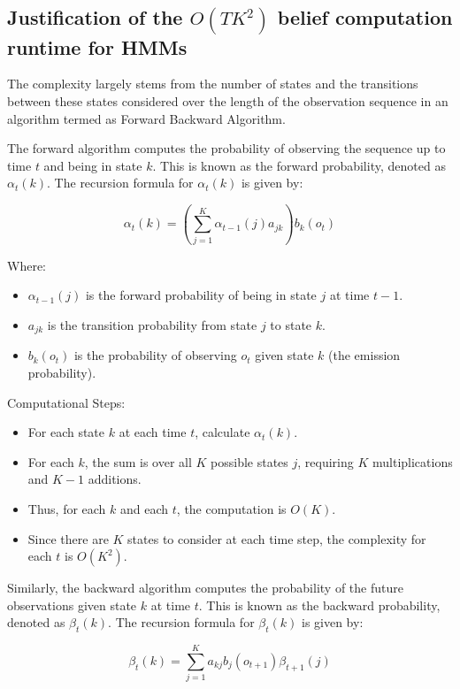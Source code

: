 \subsection{Justification of the $O(TK^2)$ belief computation runtime for HMMs}

The complexity largely stems from the number of states and the transitions between these states considered over the length of the observation sequence in an algorithm termed as Forward Backward Algorithm.

The forward algorithm computes the probability of observing the sequence up to time \( t \) and being in state \( k \). This is known as the forward probability, denoted as \( \alpha_t(k) \). The recursion formula for \( \alpha_t(k) \) is given by:

\[
\alpha_t(k) = \left( \sum_{j=1}^K \alpha_{t-1}(j) a_{jk} \right) b_k(o_t)
\]

Where:
\begin{itemize}
    \item \( \alpha_{t-1}(j) \) is the forward probability of being in state \( j \) at time \( t-1 \).
    \item \( a_{jk} \) is the transition probability from state \( j \) to state \( k \).
    \item \( b_k(o_t) \) is the probability of observing \( o_t \) given state \( k \) (the emission probability).
\end{itemize}


Computational Steps:
\begin{itemize}
    \item For each state \( k \) at each time \( t \), calculate \( \alpha_t(k) \).
    \item For each \( k \), the sum is over all \( K \) possible states \( j \), requiring \( K \) multiplications and \( K-1 \) additions.
    \item Thus, for each \( k \) and each \( t \), the computation is \( O(K) \).
    \item Since there are \( K \) states to consider at each time step, the complexity for each \( t \) is \( O(K^2) \).
\end{itemize}


Similarly, the backward algorithm computes the probability of the future observations given state \( k \) at time \( t \). This is known as the backward probability, denoted as \( \beta_t(k) \). The recursion formula for \( \beta_t(k) \) is given by:

\[
\beta_t(k) = \sum_{j=1}^K a_{kj} b_j(o_{t+1}) \beta_{t+1}(j)
\]

